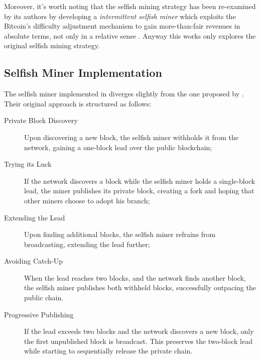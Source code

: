 Moreover, it's worth noting that the selfish mining strategy has been
re-examined by its authors by developing a \emph{intermittent selfish miner}
which exploits the Bitcoin's difficulty adjustment mechanism to gain
more-than-fair revenues in absolute terms, not only in a relative sense
\cite{intermittent-selfish-mining}. Anyway this works only explores the
original selfish mining strategy.

\subsection{Selfish Miner Implementation}\label{subsec:selfish-impl}

The selfish miner implemented in \iblock{} diverges slightly from the
one proposed by \citeauthor{selfish-mining}. Their original approach is
structured as follows:
\begin{description}
	\item[Private Block Discovery] Upon discovering a new block, the
		selfish miner withholds it from the network, gaining a
		one-block lead over the public blockchain;
	\item[Trying its Luck] If the network discovers a block while the
		selfish miner holds a single-block lead, the miner publishes
		its private block, creating a fork and hoping that other miners
		choose to adopt his branch;
	\item[Extending the Lead] Upon finding additional blocks, the selfish miner
		refrains from broadcasting, extending the lead further;
	\item[Avoiding Catch-Up] When the lead reaches two blocks, and the
		network finds another block, the selfish miner publishes both
		withheld blocks, successfully outpacing the public chain.
	\item[Progressive Publishing] If the lead exceeds two blocks and the
		network discovers a new block, only the first unpublished block
		is broadcast. This preserves the two-block lead while starting
		to sequentially release the private chain.
\end{description}

